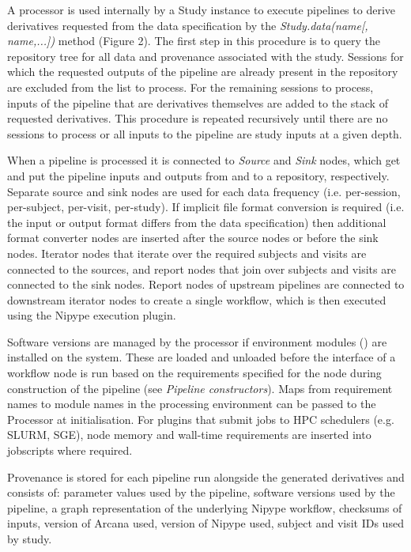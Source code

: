 A processor is used internally by a Study instance to execute pipelines
to derive derivatives requested from the data specification by the
\emph{Study.data(name{[}, name,...{]})} method (Figure 2). The first
step in this procedure is to query the repository tree for all data and
provenance associated with the study. Sessions for which the requested
outputs of the pipeline are already present in the repository are
excluded from the list to process. For the remaining sessions to
process, inputs of the pipeline that are derivatives themselves are
added to the stack of requested derivatives. This procedure is repeated
recursively until there are no sessions to process or all inputs to the
pipeline are study inputs at a given depth.

When a pipeline is processed it is connected to \emph{Source} and
\emph{Sink} nodes, which get and put the pipeline inputs and outputs
from and to a repository, respectively. Separate source and sink nodes
are used for each data frequency (i.e. per-session, per-subject,
per-visit, per-study). If implicit file format conversion is required
(i.e. the input or output format differs from the data specification)
then additional format converter nodes are inserted after the source
nodes or before the sink nodes. Iterator nodes that iterate over the
required subjects and visits are connected to the sources, and report
nodes that join over subjects and visits are connected to the sink
nodes. Report nodes of upstream pipelines are connected to downstream
iterator nodes to create a single workflow, which is then executed using
the Nipype execution plugin.

Software versions are managed by the processor if environment modules
(\cite{furlani_modules:_1991}) are installed on the system. These are loaded and
unloaded before the interface of a workflow node is run based on the
requirements specified for the node during construction of the pipeline
(see \emph{Pipeline constructors}). Maps from requirement names to
module names in the processing environment can be passed to the
Processor at initialisation. For plugins that submit jobs to HPC
schedulers (e.g. SLURM, SGE), node memory and wall-time requirements are
inserted into jobscripts where required.

Provenance is stored for each pipeline run alongside the generated
derivatives and consists of: parameter values used by the pipeline,
software versions used by the pipeline, a graph representation of the
underlying Nipype workflow, checksums of inputs, version of Arcana used,
version of Nipype used, subject and visit IDs used by study.


